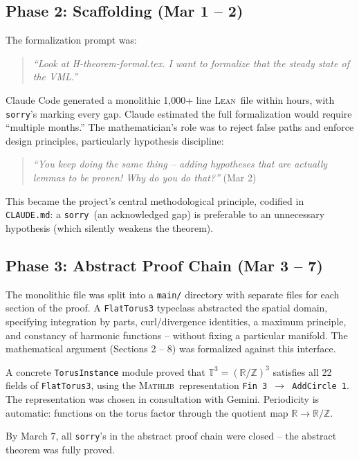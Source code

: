 \documentclass[11pt]{article}
\newcommand{\lean}{\textsc{Lean}}
\newcommand{\mathlib}{\textsc{Mathlib}}
\newcommand{\sorry}{\texttt{sorry}}
\newcommand{\RR}{\mathbb{R}}
\newcommand{\TT}{\mathbb{T}}
\begin{document}
\subsection{Phase 2: Scaffolding (Mar 1 -- 2)}

The formalization prompt was:

\begin{quote}
\emph{``Look at H-theorem-formal.tex. I want to formalize that the steady state of the VML.''}
\end{quote}

Claude Code generated a monolithic 1{,}000+ line \lean\ file within hours, with \sorry's marking every gap. Claude estimated the full formalization would require ``multiple months.'' The mathematician's role was to reject false paths and enforce design principles, particularly hypothesis discipline:

\begin{quote}
\emph{``You keep doing the same thing -- adding hypotheses that are actually lemmas to be proven! Why do you do that?''} (Mar 2)
\end{quote}

This became the project's central methodological principle, codified in \texttt{CLAUDE.md}: a \sorry\ (an acknowledged gap) is preferable to an unnecessary hypothesis (which silently weakens the theorem).

\subsection{Phase 3: Abstract Proof Chain (Mar 3 -- 7)}

The monolithic file was split into a \texttt{main/} directory with separate files for each section of the proof. A \texttt{FlatTorus3} typeclass abstracted the spatial domain, specifying integration by parts, curl/divergence identities, a maximum principle, and constancy of harmonic functions -- without fixing a particular manifold. The mathematical argument (Sections 2 -- 8) was formalized against this interface.

A concrete \texttt{TorusInstance} module proved that $\TT^3 = (\RR/\mathbb{Z})^3$ satisfies all 22 fields of \texttt{FlatTorus3}, using the \mathlib\ representation \texttt{Fin\,3\,$\to$\,AddCircle\,1}. The representation was chosen in consultation with Gemini. Periodicity is automatic: functions on the torus factor through the quotient map $\RR \to \RR/\mathbb{Z}$.

By March 7, all \sorry's in the abstract proof chain were closed -- the abstract theorem was fully proved.
\end{document}
